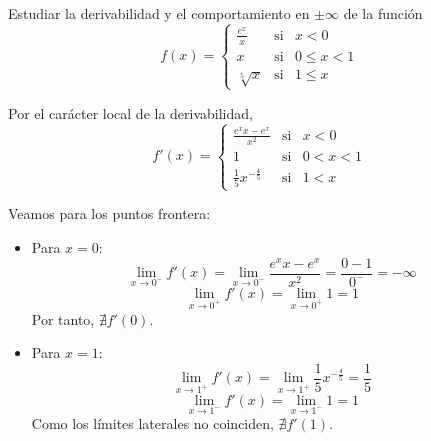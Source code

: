 \begin{ejercicio}
    Estudiar la derivabilidad y el comportamiento en $\pm \infty$ de la función
    $$f(x)=\left\{
    \begin{array}{ccc}
    \frac{e^x}{x} & \text{si} & x<0 \\
    x & \text{si} & 0\leq x < 1\\
    \sqrt[5]{x} & \text{si} & 1 \leq x
    \end{array}\right.$$

    Por el carácter local de la derivabilidad,
    $$f'(x)=\left\{
    \begin{array}{ccc}
    \frac{e^x x - e^x}{x^2} & \text{si} & x<0 \\
    1 & \text{si} & 0 < x < 1\\
    \frac{1}{5}x^{-\frac{4}{5}} & \text{si} & 1 < x
    \end{array}\right.$$

    Veamos para los puntos frontera:
    \begin{itemize}
        \item Para $x=0$:
        \begin{equation*}
            \lim_{x\to 0^-}f'(x) = \lim_{x\to 0^-} \frac{e^x x - e^x}{x^2} = \frac{0-1}{0^-} = -\infty
        \end{equation*}
        \begin{equation*}
            \lim_{x\to 0^+}f'(x) = \lim_{x\to 0^+} 1 = 1
        \end{equation*}
        Por tanto, $\nexists f'(0)$.

        \item Para $x=1$:
        \begin{equation*}
            \lim_{x\to 1^+}f'(x) = \lim_{x\to 1^+} \frac{1}{5}x^{-\frac{4}{5}} = \frac{1}{5}
        \end{equation*}
        \begin{equation*}
            \lim_{x\to 1^-}f'(x) = \lim_{x\to 1^-} 1 = 1
        \end{equation*}
        Como los límites laterales no coinciden, $\nexists f'(1)$.
    \end{itemize}
\end{ejercicio}

